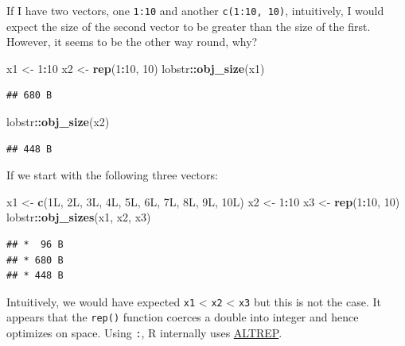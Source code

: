 \documentclass[]{book}
\newenvironment{Shaded}{\begin{snugshade}}{\end{snugshade}}
\newcommand{\DecValTok}[1]{\textcolor[rgb]{0.00,0.00,0.81}{#1}}
\newcommand{\KeywordTok}[1]{\textcolor[rgb]{0.13,0.29,0.53}{\textbf{#1}}}
\newcommand{\NormalTok}[1]{#1}
\newcommand{\OperatorTok}[1]{\textcolor[rgb]{0.81,0.36,0.00}{\textbf{#1}}}
\newcommand{\StringTok}[1]{\textcolor[rgb]{0.31,0.60,0.02}{#1}}
\begin{document}
If I have two vectors, one \texttt{1:10} and another \texttt{c(1:10,\ 10)}, intuitively, I would expect the size of the second vector to be greater than the size of the first. However, it seems to be the other way round, why?

\begin{Shaded}
\begin{Highlighting}[]
\NormalTok{x1 <-}\StringTok{ }\DecValTok{1}\OperatorTok{:}\DecValTok{10}
\NormalTok{x2 <-}\StringTok{ }\KeywordTok{rep}\NormalTok{(}\DecValTok{1}\OperatorTok{:}\DecValTok{10}\NormalTok{, }\DecValTok{10}\NormalTok{)}
\NormalTok{lobstr}\OperatorTok{::}\KeywordTok{obj_size}\NormalTok{(x1)}
\end{Highlighting}
\end{Shaded}

\begin{verbatim}
## 680 B
\end{verbatim}

\begin{Shaded}
\begin{Highlighting}[]
\NormalTok{lobstr}\OperatorTok{::}\KeywordTok{obj_size}\NormalTok{(x2)}
\end{Highlighting}
\end{Shaded}

\begin{verbatim}
## 448 B
\end{verbatim}

If we start with the following three vectors:

\begin{Shaded}
\begin{Highlighting}[]
\NormalTok{x1 <-}\StringTok{ }\KeywordTok{c}\NormalTok{(1L, 2L, 3L, 4L, 5L, 6L, 7L, 8L, 9L, 10L)}
\NormalTok{x2 <-}\StringTok{ }\DecValTok{1}\OperatorTok{:}\DecValTok{10}
\NormalTok{x3 <-}\StringTok{ }\KeywordTok{rep}\NormalTok{(}\DecValTok{1}\OperatorTok{:}\DecValTok{10}\NormalTok{, }\DecValTok{10}\NormalTok{)}
\NormalTok{lobstr}\OperatorTok{::}\KeywordTok{obj_sizes}\NormalTok{(x1, x2, x3)}
\end{Highlighting}
\end{Shaded}

\begin{verbatim}
## *  96 B
## * 680 B
## * 448 B
\end{verbatim}

Intuitively, we would have expected \texttt{x1} \textless{} \texttt{x2} \textless{} \texttt{x3} but this is not the case. It appears that the \texttt{rep()} function coerces a double into integer and hence optimizes on space. Using \texttt{:}, R internally uses \href{https://blog.revolutionanalytics.com/2017/09/altrep-preview.html}{ALTREP}.
\end{document}
